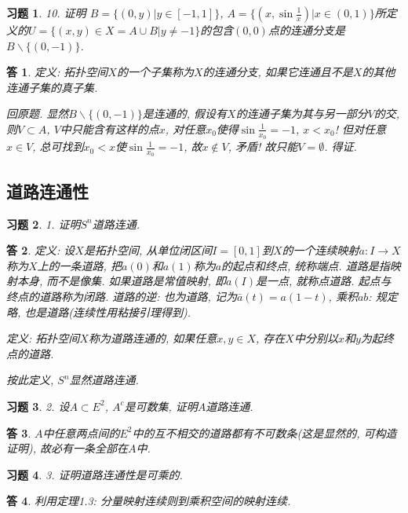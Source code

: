 \documentclass{ctexart}%
\newtheorem*{exercise}{习题}
\newtheorem*{solution}{答}
\theoremstyle{definition}
\theoremstyle{remark}
\begin{document}
\begin{exercise}10. 证明 $B=\{(0,y)|y\in [-1,1]\}$, $A=\{(x,\sin\frac{1}{x})|x\in (0,1)\}$所定义的$
U=\{(x,y)\in X=A\cup B|y\neq -1\}$的包含$(0,0)$点的连通分支是$B\backslash\{(0,-1)\}$. 
\end{exercise}
\begin{solution}
定义: 拓扑空间$X$的一个子集称为$X$的连通分支, 如果它连通且不是$X$的其他连通子集的真子集. 

回原题. 显然$B\backslash\{(0,-1)\}$是连通的, 假设有$X$的连通子集为其与另一部分$V$的交, 则$V\subset A$, $V$中只能含有这样的点$x$, 对任意$x_0$使得$\sin \frac{1}{x_0}=-1$, $x<x_0$!  但对任意$x\in V$, 总可找到$x_0<x$使$\sin \frac{1}{x_0}=-1$, 故$x\notin V$, 矛盾! 故只能$V=\emptyset$. 得证. 
\end{solution}



\subsection{道路连通性}

\begin{exercise}1. 证明$S^n$道路连通.
\end{exercise}
\begin{solution}
定义: 设$X$是拓扑空间, 从单位闭区间$I=[0,1]$到$X$的一个连续映射$a: I\rightarrow X$称为$X$上的一条道路, 把$a(0)$和$a(1)$称为$a$的起点和终点, 统称端点. 道路是指映射本身, 而不是像集. 如果道路是常值映射, 即$a(I)$是一点, 就称点道路. 起点与终点的道路称为闭路. 道路的逆: 也为道路, 记为$\bar{a}(t)=a(1-t)$, 乘积$ab$: 规定略, 也是道路(连续性用粘接引理得到).

定义: 拓扑空间$X$称为道路连通的, 如果任意$x,y\in X$, 存在$X$中分别以$x$和$y$为起终点的道路. 

按此定义, $S^n$显然道路连通.
\end{solution}

\begin{exercise}2. 设$A\subset E^2$, $A^c$是可数集, 证明$A$道路连通. 
\end{exercise}
\begin{solution}$A$中任意两点间的$E^2$中的互不相交的道路都有不可数条(这是显然的, 可构造证明), 故必有一条全部在$A$中. 
\end{solution}

\begin{exercise}3. 证明道路连通性是可乘的.
\end{exercise}
\begin{solution}利用定理1.3: 分量映射连续则到乘积空间的映射连续.
\end{solution}
\end{document}
